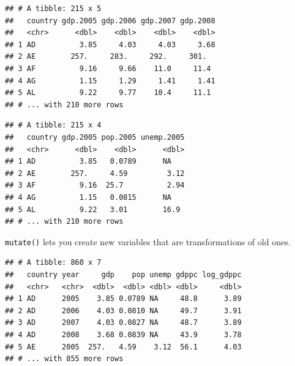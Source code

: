 \documentclass[12pt,oneside,openany]{book}
\newenvironment{Shaded}{\begin{snugshade}}{\end{snugshade}}
\newcommand{\KeywordTok}[1]{\textcolor[rgb]{0.13,0.29,0.53}{\textbf{#1}}}
\newcommand{\DataTypeTok}[1]{\textcolor[rgb]{0.13,0.29,0.53}{#1}}
\newcommand{\StringTok}[1]{\textcolor[rgb]{0.31,0.60,0.02}{#1}}
\newcommand{\OperatorTok}[1]{\textcolor[rgb]{0.81,0.36,0.00}{\textbf{#1}}}
\newcommand{\NormalTok}[1]{#1}
\begin{document}
\begin{verbatim}
## # A tibble: 215 x 5
##   country gdp.2005 gdp.2006 gdp.2007 gdp.2008
##   <chr>      <dbl>    <dbl>    <dbl>    <dbl>
## 1 AD          3.85     4.03     4.03     3.68
## 2 AE        257.     283.     292.     301.  
## 3 AF          9.16     9.66    11.0     11.4 
## 4 AG          1.15     1.29     1.41     1.41
## 5 AL          9.22     9.77    10.4     11.1 
## # ... with 210 more rows
\end{verbatim}

\begin{Shaded}
\end{Shaded}

\begin{verbatim}
## # A tibble: 215 x 4
##   country gdp.2005 pop.2005 unemp.2005
##   <chr>      <dbl>    <dbl>      <dbl>
## 1 AD          3.85   0.0789      NA   
## 2 AE        257.     4.59         3.12
## 3 AF          9.16  25.7          2.94
## 4 AG          1.15   0.0815      NA   
## 5 AL          9.22   3.01        16.9 
## # ... with 210 more rows
\end{verbatim}

\texttt{mutate()} lets you create new variables that are transformations
of old ones.

\begin{Shaded}
\end{Shaded}

\begin{verbatim}
## # A tibble: 860 x 7
##   country year     gdp    pop unemp gdppc log_gdppc
##   <chr>   <chr>  <dbl>  <dbl> <dbl> <dbl>     <dbl>
## 1 AD      2005    3.85 0.0789 NA     48.8      3.89
## 2 AD      2006    4.03 0.0810 NA     49.7      3.91
## 3 AD      2007    4.03 0.0827 NA     48.7      3.89
## 4 AD      2008    3.68 0.0839 NA     43.9      3.78
## 5 AE      2005  257.   4.59    3.12  56.1      4.03
## # ... with 855 more rows
\end{verbatim}
\end{document}
